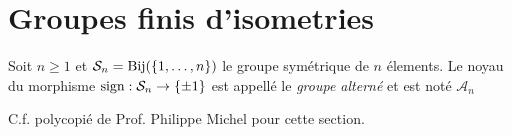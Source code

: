 \section{Groupes finis d'isometries}

\begin{definition}
	Soit $n \geq 1$ et $\mathcal{S}_n = \operatorname{Bij}(\{1, \dots, n\})$ le groupe
	symétrique de $n$ élements. Le noyau du morphisme $\operatorname{sign}: \mathcal{S}_n \to
	\{\pm1\}$ est appellé le \emph{groupe alterné} et est noté $\mathcal{A}_n$
\end{definition}

C.f. polycopié de Prof. Philippe Michel pour cette section.
